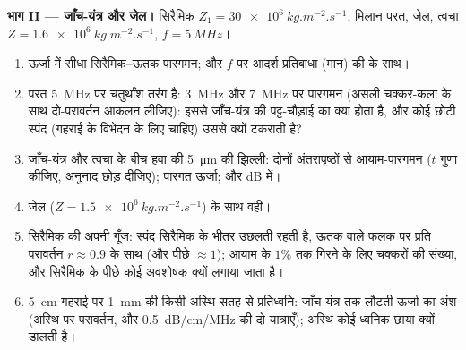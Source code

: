 \begin{problem}
\medskip
\noindent\textbf{भाग II --- जाँच-यंत्र और जेल।}
सिरैमिक $Z_1 = \qty{30e6}{kg.m^{-2}.s^{-1}}$, मिलान परत, जेल, त्वचा $Z =
\qty{1.6e6}{kg.m^{-2}.s^{-1}}$, $f = \qty{5}{MHz}$।
\begin{enumerate}[resume]
  \item ऊर्जा में सीधा सिरैमिक--ऊतक पारगमन; और $f$ पर आदर्श
        प्रतिबाधा (मान) की  के साथ।
  \item परत \qty{5}{MHz} पर चतुर्थांश तरंग है: \qty{3}{MHz} और
        \qty{7}{MHz} पर पारगमन (असली चक्कर-कला के साथ दो-परावर्तन
        आकलन लीजिए): इससे जाँच-यंत्र की पट्ट-चौड़ाई का क्या होता
        है, और कोई छोटी स्पंद (गहराई के विभेदन के लिए चाहिए)
        उससे क्यों टकराती है?
  \item जाँच-यंत्र और त्वचा के बीच हवा की \qty{5}{\micro m} की झिल्ली:
        दोनों अंतरापृष्ठों से आयाम-पारगमन ($t$ गुणा कीजिए,
        अनुनाद छोड़ दीजिए); पारगत ऊर्जा; और dB में।
  \item जेल ($Z = \qty{1.5e6}{kg.m^{-2}.s^{-1}}$) के साथ वही।
  \item सिरैमिक की अपनी गूँज: स्पंद सिरैमिक के भीतर उछलती रहती है,
        ऊतक वाले फलक पर प्रति परावर्तन $r \approx 0.9$ के साथ
        (और पीछे $\approx 1$); आयाम के $1\%$ तक गिरने के लिए
        चक्करों की संख्या, और सिरैमिक के पीछे कोई अवशोषक क्यों
        लगाया जाता है।
  \item \qty{5}{cm} गहराई पर \qty{1}{mm} की किसी अस्थि-सतह से प्रतिध्वनि:
        जाँच-यंत्र तक लौटती ऊर्जा का अंश (अस्थि पर परावर्तन, और
        \qty{0.5}{dB/cm/MHz}  की दो यात्राएँ); अस्थि कोई ध्वनिक
        छाया क्यों डालती है।
\end{enumerate}


\end{problem}

